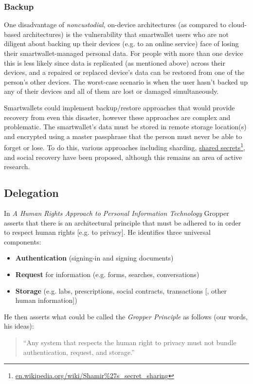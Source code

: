 \documentclass[11pt, oneside]{article}   	%
\newcommand{\hyperfootnote}[1][]{\def\ArgI{{#1}}\hyperfootnoteRelay}
\newcommand\hyperfootnoteRelay[2][]{\href{#1#2}{\ArgI}\footnote{\href{#1#2}{#2}}}
\begin{document}
\subsubsection{Backup} 

One disadvantage of \emph{noncustodial}, on-device architectures (as compared to cloud-based architectures) is the vulnerability that smartwallet users who are not diligent about backing up their devices (e.g. to an online service) face of losing their smartwallet-managed personal data. For people with more than one device this is less likely since data is replicated (as mentioned above) across their devices, and a repaired or replaced device's data can be restored from one of the person's other devices. The worst-case scenario is when the user hasn't backed up any of their devices and all of them are lost or damaged simultaneously. 

Smartwallets could implement backup/restore approaches that would provide recovery from even this disaster, however these approaches are complex and problematic. The smartwallet's data must be stored in remote storage location(s) and encrypted using a master passphrase that the person must never be able to forget or lose. To do this, various approaches including sharding, \hyperfootnote[shared secrets][https://]{en.wikipedia.org/wiki/Shamir\%27s\_secret\_sharing}, and social recovery have been proposed, although this remains an area of active research. 

\subsection{Delegation}

In \emph{A Human Rights Approach to Personal Information Technology}\cite{Gropper2022} Gropper asserts that there is an architectural principle that must be adhered to in order to respect human rights [e.g. to privacy]. He identifies three universal components:

\begin{itemize}
\item \textbf{Authentication} (signing-in and signing documents)
\item \textbf{Request} for information (e.g. forms, searches, conversations)
\item \textbf{Storage} (e.g. labs, prescriptions, social contracts, transactions [, other human information])
\end{itemize}

He then asserts what could be called the \emph{Gropper Principle} as follows (our words, his ideas):
\begin{quote}
``Any system that respects the human right to privacy must not bundle authentication, request, and storage.''
\end{quote}
\end{document}
